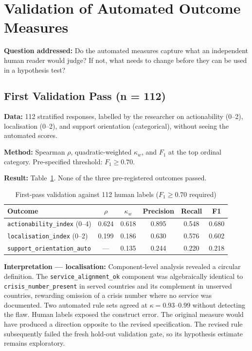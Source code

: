 \section{Validation of Automated Outcome Measures}

\textbf{Question addressed:} Do the automated measures capture what an independent human reader would judge? If not, what needs to change before they can be used in a hypothesis test?

\subsection{First Validation Pass (n = 112)}

\textbf{Data:} 112 stratified responses, labelled by the researcher on actionability (0--2), localisation (0--2), and support orientation (categorical), without seeing the automated scores.

\textbf{Method:} Spearman $\rho$, quadratic-weighted $\kappa_w$, and $F_1$ at the top ordinal category. Pre-specified threshold: $F_1 \geq 0.70$.

\textbf{Result:} Table~\ref{tab:val1}. None of the three pre-registered outcomes passed.

\begin{table}[H]
\centering
\caption{First-pass validation against 112 human labels ($F_1 \geq 0.70$ required)}
\label{tab:val1}
\begin{tabular}{lccccc}
\toprule
Outcome & $\rho$ & $\kappa_w$ & Precision & Recall & F1 \\
\midrule
\texttt{actionability\_index} (0--4) & 0.624 & 0.618 & 0.895 & 0.548 & 0.680 \\
\texttt{localisation\_index} (0--2) & 0.199 & 0.186 & 0.630 & 0.576 & 0.602 \\
\texttt{support\_orientation\_auto} & --- & 0.135 & 0.244 & 0.220 & 0.218 \\
\bottomrule
\end{tabular}
\end{table}

\textbf{Interpretation --- localisation:} Component-level analysis revealed a circular definition. The \texttt{service\_alignment\_ok} component was algebraically identical to \texttt{crisis\_number\_present} in served countries and its complement in unserved countries, rewarding omission of a crisis number where no service was documented. Two automated rule sets agreed at $\kappa = 0.93$--$0.99$ without detecting the flaw. Human labels exposed the construct error. The original measure would have produced a direction opposite to the revised specification. The revised rule subsequently failed the fresh hold-out validation gate, so its hypothesis estimate remains exploratory.


